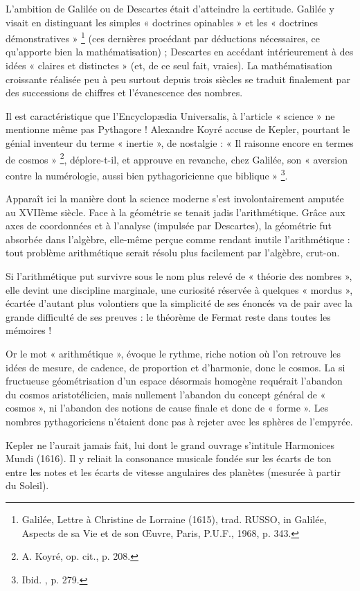 \documentclass[a4paper,12pt]{article}
\begin{document}
	L'ambition de Galilée ou de Descartes était d'atteindre la certitude. Galilée y visait en distinguant les simples « doctrines opinables » et les « doctrines démonstratives » \footnote{Galilée, Lettre à Christine de Lorraine (1615), trad. RUSSO, in Galilée, Aspects de sa Vie et de son Œuvre, Paris, P.U.F., 1968, p. 343.} (ces dernières procédant par déductions nécessaires, ce qu'apporte bien la mathématisation) ; Descartes en accédant intérieurement à des idées « claires et distinctes » (et, de ce seul fait, vraies).
La mathématisation croissante réalisée peu à peu surtout depuis trois siècles se traduit finalement par des successions de chiffres et l’évanescence des nombres. 

Il est caractéristique que l’Encyclopædia Universalis, à l’article « science » ne mentionne même pas Pythagore ! Alexandre Koyré accuse de Kepler, pourtant le génial inventeur du terme « inertie », de nostalgie : « Il raisonne encore en termes de cosmos » \footnote{A. Koyré, op. cit., p. 208.}, déplore-t-il, et approuve en revanche, chez Galilée, son « aversion contre la numérologie, aussi bien pythagoricienne que biblique » \footnote{Ibid. , p. 279.}. 

Apparaît ici la manière dont la science moderne s’est involontairement amputée au XVIIème siècle. Face à la géométrie se tenait jadis l’arithmétique. Grâce aux axes de coordonnées et à l’analyse (impulsée par Descartes), la géométrie fut absorbée dans l’algèbre, elle-même perçue comme rendant inutile l’arithmétique : tout problème arithmétique serait résolu plus facilement par l’algèbre, crut-on. 

Si l’arithmétique put survivre sous le nom plus relevé de « théorie des nombres », elle devint une discipline marginale, une curiosité réservée à quelques « mordus », écartée d’autant plus volontiers que la simplicité de ses énoncés va de pair avec la grande difficulté de ses preuves : le théorème de Fermat reste dans toutes les mémoires !

Or le mot « arithmétique », évoque le rythme, riche notion où l’on retrouve les idées de mesure, de cadence, de proportion et d’harmonie, donc le cosmos. La si fructueuse géométrisation d’un espace désormais homogène requérait l’abandon du cosmos aristotélicien, mais nullement l’abandon du concept général de « cosmos », ni l’abandon des notions de cause finale et donc de « forme ». Les nombres pythagoriciens n’étaient donc pas à rejeter avec les sphères de l’empyrée. 

Kepler ne l’aurait jamais fait, lui dont le grand ouvrage s’intitule Harmonices Mundi (1616). Il y reliait la consonance musicale fondée sur les écarts de ton entre les notes et les écarts de vitesse angulaires des planètes (mesurée à partir du Soleil). 
\end{document}
